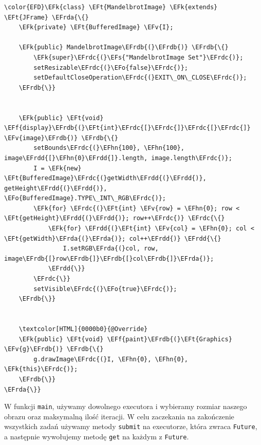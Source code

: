 \documentclass[11pt]{article}
\newcommand{\EFs}[1]{\textcolor{EFs}{#1}} %
\newcommand{\EFk}[1]{\textcolor{EFk}{#1}} %
\newcommand{\EFf}[1]{\textcolor{EFf}{#1}} %
\newcommand{\EFv}[1]{\textcolor{EFv}{#1}} %
\newcommand{\EFt}[1]{\textcolor{EFt}{#1}} %
\newcommand{\EFo}[1]{\textcolor{EFo}{#1}} %
\newcommand{\EFhn}[1]{\textcolor{EFhn}{#1}} %
\newcommand{\EFrda}[1]{#1} %
\newcommand{\EFrdb}[1]{\textcolor{EFrdb}{#1}} %
\newcommand{\EFrdc}[1]{\textcolor{EFrdc}{#1}} %
\newcommand{\EFrdd}[1]{\textcolor{EFrdd}{#1}} %
\begin{document}
\begin{Code}
\begin{Verbatim}
\color{EFD}\EFk{class} \EFt{MandelbrotImage} \EFk{extends} \EFt{JFrame} \EFrda{\{}
    \EFk{private} \EFt{BufferedImage} \EFv{I};

    \EFk{public} MandelbrotImage\EFrdb{(}\EFrdb{)} \EFrdb{\{}
        \EFk{super}\EFrdc{(}\EFs{"MandelbrotImage Set"}\EFrdc{)};
        setResizable\EFrdc{(}\EFo{false}\EFrdc{)};
        setDefaultCloseOperation\EFrdc{(}EXIT\_ON\_CLOSE\EFrdc{)};
    \EFrdb{\}}


    \EFk{public} \EFt{void} \EFf{display}\EFrdb{(}\EFt{int}\EFrdc{[}\EFrdc{]}\EFrdc{[}\EFrdc{]} \EFv{image}\EFrdb{)} \EFrdb{\{}
        setBounds\EFrdc{(}\EFhn{100}, \EFhn{100}, image\EFrdd{[}\EFhn{0}\EFrdd{]}.length, image.length\EFrdc{)};
        I = \EFk{new} \EFt{BufferedImage}\EFrdc{(}getWidth\EFrdd{(}\EFrdd{)}, getHeight\EFrdd{(}\EFrdd{)}, \EFo{BufferedImage}.TYPE\_INT\_RGB\EFrdc{)};
        \EFk{for} \EFrdc{(}\EFt{int} \EFv{row} = \EFhn{0}; row < \EFt{getHeight}\EFrdd{(}\EFrdd{)}; row++\EFrdc{)} \EFrdc{\{}
            \EFk{for} \EFrdd{(}\EFt{int} \EFv{col} = \EFhn{0}; col < \EFt{getWidth}\EFrda{(}\EFrda{)}; col++\EFrdd{)} \EFrdd{\{}
                I.setRGB\EFrda{(}col, row, image\EFrdb{[}row\EFrdb{]}\EFrdb{[}col\EFrdb{]}\EFrda{)};
            \EFrdd{\}}
        \EFrdc{\}}
        setVisible\EFrdc{(}\EFo{true}\EFrdc{)};
    \EFrdb{\}}


    \textcolor[HTML]{0000b0}{@Override}
    \EFk{public} \EFt{void} \EFf{paint}\EFrdb{(}\EFt{Graphics} \EFv{g}\EFrdb{)} \EFrdb{\{}
        g.drawImage\EFrdc{(}I, \EFhn{0}, \EFhn{0}, \EFk{this}\EFrdc{)};
    \EFrdb{\}}
\EFrda{\}}
\end{Verbatim}
\end{Code}

W funkcji \texttt{main}, używamy dowolnego executora i wybieramy rozmiar naszego obrazu
oraz maksymalną ilość iteracji. W celu zaczekania na zakończenie wszystkich
zadań używamy metody \texttt{submit} na executorze, która zwraca \texttt{Future}, a następnie
wywołujemy metodę \texttt{get} na każdym z \texttt{Future}.
\end{document}
